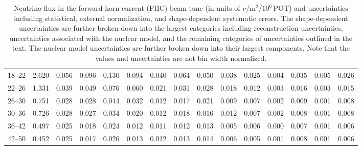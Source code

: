 \begin{turnpage}
\begin{table}[pht]
\begin{tabular}{ccccc|cccc|cccccc}
 18--22 & 	 2.620 &  	 0.056 &  	 0.096 &  	 0.130 &  	 0.094 &  	 0.040 &  	 0.064 &  	 0.050 &  	 0.038 &  	 0.025 &  	 0.004 &  	 0.035 &  	 0.005 &  	 0.026 \\ 
 22--26 & 	 1.331 &  	 0.039 &  	 0.049 &  	 0.076 &  	 0.060 &  	 0.021 &  	 0.031 &  	 0.028 &  	 0.018 &  	 0.012 &  	 0.003 &  	 0.016 &  	 0.003 &  	 0.015 \\ 
 26--30 & 	 0.751 &  	 0.028 &  	 0.028 &  	 0.044 &  	 0.032 &  	 0.012 &  	 0.017 &  	 0.021 &  	 0.009 &  	 0.007 &  	 0.002 &  	 0.009 &  	 0.001 &  	 0.008 \\ 
 30--36 & 	 0.726 &  	 0.028 &  	 0.027 &  	 0.034 &  	 0.020 &  	 0.012 &  	 0.018 &  	 0.016 &  	 0.012 &  	 0.007 &  	 0.002 &  	 0.008 &  	 0.001 &  	 0.008 \\ 
 36--42 & 	 0.497 &  	 0.025 &  	 0.018 &  	 0.024 &  	 0.012 &  	 0.011 &  	 0.012 &  	 0.013 &  	 0.005 &  	 0.006 &  	 0.000 &  	 0.007 &  	 0.001 &  	 0.006 \\ 
 42--50 & 	 0.452 &  	 0.025 &  	 0.017 &  	 0.026 &  	 0.013 &  	 0.012 &  	 0.013 &  	 0.014 &  	 0.006 &  	 0.005 &  	 0.001 &  	 0.008 &  	 0.001 &  	 0.006 \\
 \hline
 \end{tabular}
\caption{Neutrino flux in the forward horn current (FHC) beam tune (in units of $\nu$/m$^2$/$10^6$\,POT) and uncertainties including statistical, external normalization, and shape-dependent systematic errors. The shape-dependent uncertainties are further broken down into the largest categories including reconstruction uncertainties, uncertainties associated with the nuclear model, and the remaining categories of uncertainties outlined in the text. The nuclear model uncertainties are further broken down into their largest components. Note that the values and uncertainties are not bin width normalized.} 
\label{tbl:FHC-nu-flux}
\end{table}


\end{turnpage}
